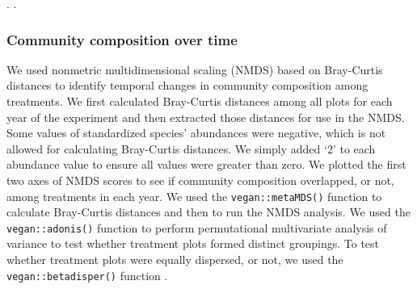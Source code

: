\documentclass[fleqn,10pt,lineno]{wlpeerj} %
\begin{document}

\citet{Wilcox2017}.
\citep{R2016}.

\hypertarget{community-composition-over-time}{%
\subsubsection{Community composition over
time}\label{community-composition-over-time}}

We used nonmetric multidimensional scaling (NMDS) based on Bray-Curtis
distances to identify temporal changes in community composition among
treatments. We first calculated Bray-Curtis distances among all plots
for each year of the experiment and then extracted those distances for
use in the NMDS. Some values of standardized species' abundances were
negative, which is not allowed for calculating Bray-Curtis distances. We
simply added `2' to each abundance value to ensure all values were
greater than zero. We plotted the first two axes of NMDS scores to see
if community composition overlapped, or not, among treatments in each
year. We used the \texttt{vegan::metaMDS()} function \citep{Oksanen2016}
to calculate Bray-Curtis distances and then to run the NMDS analysis. We
used the \texttt{vegan::adonis()} function \citep{Oksanen2016} to
perform permutational multivariate analysis of variance to test whether
treatment plots formed distinct groupings. To test whether treatment
plots were equally dispersed, or not, we used the
\texttt{vegan::betadisper()} function \citep{Oksanen2016}.
\end{document}

